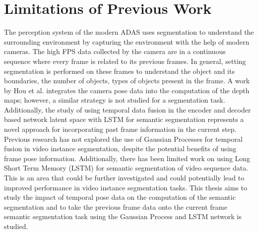     \section{Limitations of Previous Work}
    
    The perception system of the modern ADAS uses segmentation to understand the surrounding environment by capturing the environment with the help of modern cameras. The high FPS data collected by the camera are in a continuous sequence where every frame is related to its previous frames. In general, setting segmentation is performed on these frames to understand the object and its boundaries, the number of objects, types of objects present in the frame. A work by Hou et al. \cite{52_hou2019multi} integrates the camera pose data into the computation of the depth maps; however, a similar strategy is not studied for a segmentation task. Additionally, the study of using temporal data fusion in the encoder and decoder based network latent space with LSTM for semantic segmentation represents a novel approach for incorporating past frame information in the current step. Previous research has not explored the use of Gaussian Processes for temporal fusion in video instance segmentation, despite the potential benefits of using frame pose information. Additionally, there has been limited work on using Long Short Term Memory (LSTM) for semantic segmentation of video sequence data. This is an area that could be further investigated and could potentially lead to improved performance in video instance segmentation tasks. This thesis aims to study the impact of temporal pose data on the computation of the semantic segmentation and to take the previous frame data onto the current frame semantic segmentation task using the Gaussian Process and LSTM network is studied. 
    

